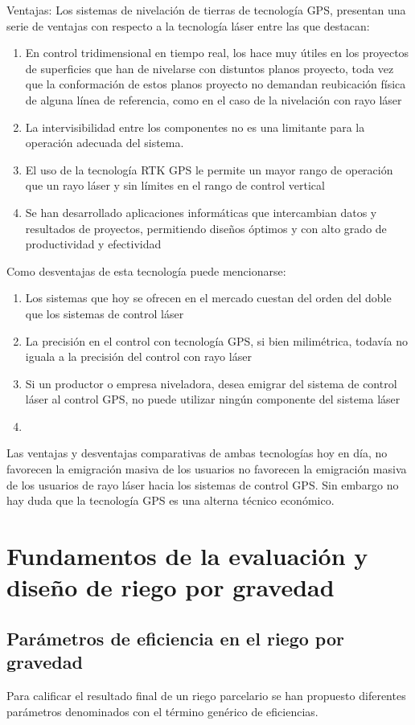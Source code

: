 Ventajas:
Los sistemas de nivelación de tierras de tecnología GPS, presentan una serie de ventajas con respecto a la tecnología láser entre las que destacan:
\begin{enumerate}
    \item En control tridimensional en tiempo real, los hace muy útiles en los proyectos de superficies que han de nivelarse con distuntos planos proyecto, toda vez que la conformación de estos planos proyecto no demandan reubicación física de alguna línea de referencia, como en el caso de la nivelación con rayo láser
    \item La intervisibilidad entre los componentes no es una limitante para la operación adecuada del sistema.
    \item El uso de la tecnología RTK GPS le permite un mayor rango de operación que un rayo láser y sin límites en el rango de control vertical
    \item Se han desarrollado aplicaciones informáticas que intercambian datos y resultados de proyectos, permitiendo diseños óptimos y con alto grado de productividad y efectividad
\end{enumerate}
Como desventajas de esta tecnología puede mencionarse:
\begin{enumerate}
    \item Los sistemas que hoy se ofrecen en el mercado cuestan del orden del doble que los sistemas de control láser
    \item La precisión en el control con tecnología GPS, si bien milimétrica, todavía no iguala a la precisión del control con rayo láser
    \item Si un productor o empresa niveladora, desea emigrar del sistema de control láser al control GPS, no puede utilizar ningún componente del sistema láser
    \item 
\end{enumerate}
Las ventajas y desventajas comparativas de ambas tecnologías hoy en día, no favorecen la emigración masiva de los usuarios no favorecen la emigración masiva de los usuarios de rayo láser hacia los sistemas de control GPS. Sin embargo no hay duda que la tecnología GPS es una alterna técnico económico.

\section{Fundamentos de la evaluación y diseño de riego por gravedad}
\subsection{Parámetros de eficiencia en el riego por gravedad}
Para calificar el resultado final de un riego parcelario se han propuesto diferentes parámetros denominados con el término genérico de eficiencias.

